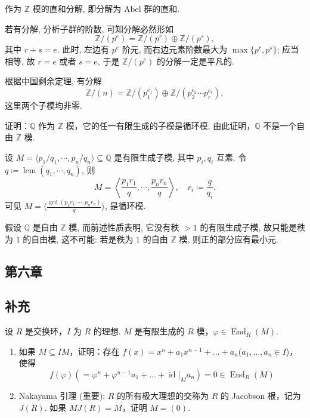\begin{solution}
    作为 $\mathbb{Z}$ 模的直和分解, 即分解为 Abel 群的直和.
    \par 若有分解, 分析子群的阶数, 可知分解必然形如
        \[
            \mathbb{Z}/(p^{e})=\mathbb{Z}/(p^{r})\oplus\mathbb{Z}/(p^{s}),
        \]
    其中 $r+s=e$. 此时, 左边有 $p^{e}$ 阶元, 而右边元素阶数最大为 $\max\{p^{r},p^{s}\}$; 应当相等, 故 $r=e$ 或者 $s=e$, 于是 $\mathbb{Z}/(p^{e})$ 的分解一定是平凡的.
    \par 根据中国剩余定理, 有分解
        \[
            \mathbb{Z}/(n)=\mathbb{Z}/(p_{1}^{e_{1}})\oplus\mathbb{Z}/(p_{2}^{e_{2}}\cdots p_{r}^{e_{r}}),
        \]
    这里两个子模均非零. 
\end{solution}

\setcounter{pb}{20}
\begin{problem}
    证明：$ \mathbb{Q} $ 作为 $ \mathbb{Z} $ 模，它的任一有限生成的子模是循环模. 由此证明，$ \mathbb{Q} $ 不是一个自由 $ \mathbb{Z} $ 模. 
\end{problem}

\begin{solution}
    设 $M=\langle p_{1}/q_{1},\cdots,p_{n}/q_{n} \rangle \subseteq \mathbb{Q}$ 是有限生成子模, 其中 $p_{i},q_{i}$ 互素. 
    令 $q \coloneqq \operatorname{lcm}(q_{1},\cdots,q_{n})$, 则
        \[
            M=\left\langle \frac{p_{1}r_{1}}{q},\cdots,\frac{p_{n}r_{n}}{q} \right\rangle,\quad r_{i}\coloneqq \frac{q}{q_{i}}.
        \]
    可见 $M=\bigl\langle \frac{\gcd({p_{1}r_{1}},\cdots,{p_{n}r_{n}})}{q} \bigr\rangle$, 是循环模.
    \par 假设 $\mathbb{Q}$ 是自由 $\mathbb{Z}$ 模, 而前述性质表明, 它没有秩 $>1$ 的有限生成子模, 故只能是秩为 $1$ 的自由模, 这不可能: 若是秩为 $1$ 的自由 $\mathbb{Z}$ 模, 则正的部分应有最小元.
\end{solution}

\subsection{第六章}

\subsection{补充}

\setcounter{pb}{3}
\begin{problem}
    设 $ R $ 是交换环，$ I $ 为 $ R $ 的理想. $ M $ 是有限生成的 $ R $ 模，$ \varphi \in \operatorname{End}_R(M) $. 
    \begin{enumerate}[label=(\arabic*)]
        \item 如果 $ M \subseteq IM $，证明：存在 $ f(x) = x^n + a_1 x^{n-1} + \dots + a_n $($ a_1, \dots, a_n \in I $)，使得
              \[
                  f(\varphi) (= \varphi^n + \varphi^{n-1} a_1 + \dots + \operatorname{id} |_M a_n) = 0 \in \operatorname{End}_R(M)
              \]
        \item Nakayama 引理 (重要): $ R $ 的所有极大理想的交称为 $ R $ 的 Jacobson 根，记为 $ J(R) $. 如果 $ M J(R) = M $，证明 $ M = (0) $. 
    \end{enumerate}
\end{problem}

